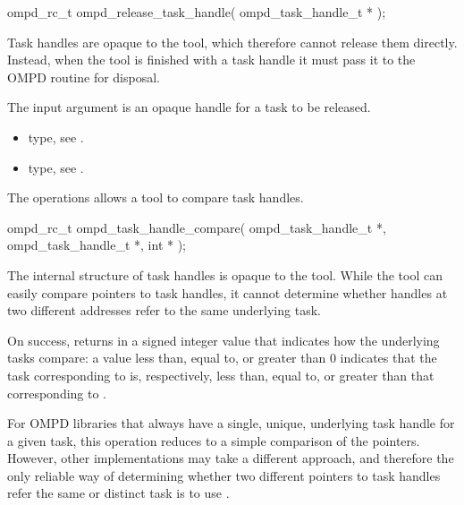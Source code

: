 \begin{cspecific}
\begin{ompSyntax}
ompd_rc_t ompd_release_task_handle(
  ompd_task_handle_t *
);
\end{ompSyntax}
\end{cspecific}


\descr
Task handles are opaque to the tool, which therefore cannot release
them directly. Instead, when the tool is finished with a task handle it must
pass it to the OMPD  routine
for disposal.

\argdesc
The input argument  is an opaque handle for a task
to be released.

\crossreferences
\begin{itemize}
	\item {} type, see .
	\item {} type, see .
\end{itemize}


\label{subsubsubsec:ompd_task_handle_compare}
\summary
The  operations allows a tool to compare task
handles.

\format

\begin{cspecific}
\begin{ompSyntax}
ompd_rc_t ompd_task_handle_compare(
  ompd_task_handle_t *,
  ompd_task_handle_t *,
  int *
);
\end{ompSyntax}
\end{cspecific}


\descr
The internal structure of task handles is opaque to the tool. While the tool can easily compare
pointers to task handles, it cannot determine whether handles at two different addresses refer
to the same underlying task.

On success,  returns in  a signed integer
value that indicates how the underlying tasks compare: a value less than, equal to, or greater than
0 indicates that the task corresponding to  is, respectively, less than, equal
to, or greater than that corresponding to .

For OMPD libraries that always have a single, unique, underlying task handle for a given
task, this operation reduces to a simple comparison of the pointers. However, other
implementations may take a different approach, and therefore the only reliable way of determining
whether two different pointers to task handles refer the same or distinct task is to use
.

